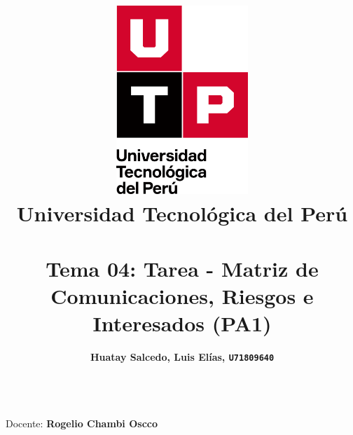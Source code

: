\documentclass{article}
\title{
  \pagenumbering{gobble}
  \vspace{1cm}
  \includegraphics[width=5cm,clip,trim=0cm 2.9cm 0cm 0cm]{./assets/isotipo-utp.png} \\
  \vspace{0.5cm}
  \textbf{Universidad Tecnológica del Perú} \\
  \vspace{0.5cm}
  \text{Gestión de Proyectos} \\
  \vspace{1cm}
    {\huge \textbf{Tema 04: Tarea - Matriz de Comunicaciones, Riesgos e Interesados (PA1)}} \\
  \vspace{1cm}
}
\author{
  \begin{tabular}{ll}
    \textbf{Huatay Salcedo, Luis Elías, \texttt{U71809640}}\\
  \end{tabular} \\
}
\begin{document}
\maketitle
\begin{center}
  Docente: \textbf{Rogelio Chambi Oscco}
\end{center}

%
%

\newpage



\newpage
\setcounter{page}{1}  


% 

% 

% 

% 
\end{document}
